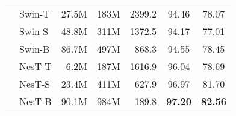 \documentclass{article}
\newcommand{\OURS}{NesT\xspace}
\begin{document}
\begin{table*}[t]
\begin{tabular}{cl|rrr|cc}
           & Swin-T  \cite{liu2021swin}    &   27.5M        &   183M   & 2399.2      & 94.46            & 78.07 \\
                              & Swin-S \cite{liu2021swin}     &   48.8M        &   311M   & 1372.5      & 94.17            & 77.01 \\
                              & Swin-B \cite{liu2021swin}     &   86.7M        &   497M   & 868.3      & 94.55            & 78.45 \\ 
                              
                              & \OURS-T     &  6.2M          & 187M     & 1616.9      & 96.04	         & 78.69 \\
                              & \OURS-S      &  23.4M         & 411M    & 627.9  & 96.97 &	81.70\\
                              & \OURS-B      &  90.1M          & 984M     & 189.8  & \textbf{97.20} &	\textbf{82.56}   \\\bottomrule
                             
\end{tabular}
\vspace{-.2cm}
\end{table*}
\end{document}
